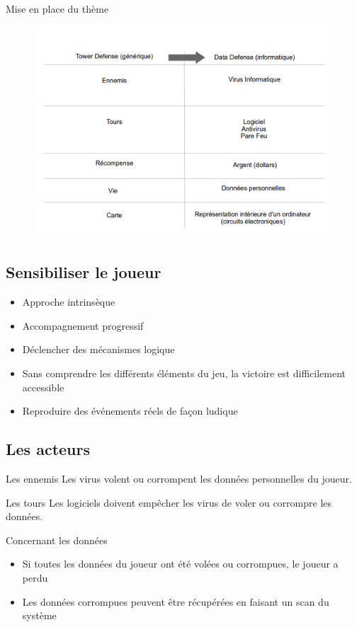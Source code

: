 \documentclass[usepdftitle=false]{beamer}
\begin{document}
	\begin{frame}
		Mise en place du thème
		\begin{figure}
			\center
    			\includegraphics[scale=0.3]{adapt.png}
		\end{figure}
	\end{frame}
	
	\subsection{Sensibiliser le joueur}
	\begin{frame}
		\begin{itemize}
			\item Approche intrinsèque
			\item Accompagnement progressif
			\item Déclencher des mécanismes logique
			\item Sans comprendre les différents éléments du jeu, la victoire est difficilement accessible
			\item Reproduire des événements réels de façon ludique
		\end{itemize}
	\end{frame}
	
	\subsection{Les acteurs}
	\begin{frame}
	\begin{block}{Les ennemis}
  			Les virus volent ou corrompent les données personnelles du joueur.
 		\end{block}
 		\begin{block}{Les tours}
  			Les logiciels doivent empêcher les virus de voler ou corrompre les données.
 		\end{block}
 		Concernant les données
 		\begin{itemize}
			\item Si toutes les données du joueur ont été volées ou corrompues, le joueur a perdu
			\item Les données corrompues peuvent être récupérées en faisant un scan du système
		\end{itemize}
	\end{frame}
	
\end{document}
